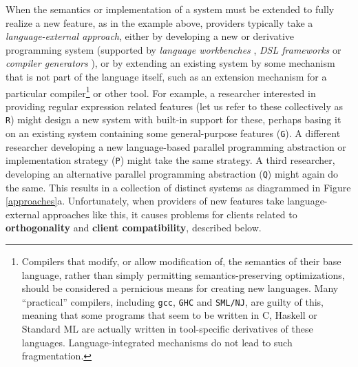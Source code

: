When the semantics or implementation of a system must be extended to fully realize a new feature, as in the example above, providers typically take a \emph{language-external approach}, either by developing a new or derivative programming system (supported by \emph{language workbenches} \cite{erdweg2013state},  \emph{DSL frameworks} \cite{fowler2010domain} or \emph{compiler generators} \cite{abc}), or by extending an existing system by some mechanism that is not part of the language itself, such as an extension mechanism for a {particular} compiler\footnote{Compilers that modify, or allow modification of, the semantics of their base language, rather than simply permitting semantics-preserving optimizations, should be considered a pernicious means for creating new languages. Many ``practical'' compilers, including \texttt{gcc}, \texttt{GHC} and \texttt{SML/NJ}, are guilty of this, meaning that some programs that seem to be written in C, Haskell or Standard ML are actually written in tool-specific derivatives of these languages. Language-integrated mechanisms do not lead to such fragmentation.} or other tool. For example, a researcher interested in providing regular expression related features (let us refer to these collectively as \texttt{R}) might design a new system with built-in support for these, perhaps basing it on an existing system containing some general-purpose features (\texttt{G}). A different researcher developing a new language-based parallel programming abstraction or implementation strategy (\texttt{P}) might  take the same strategy. A third researcher, developing an alternative parallel programming abstraction (\texttt{Q}) might again do the same. This results in a collection of distinct systems as diagrammed in Figure \ref{approaches}a. Unfortunately, when providers of new features take language-external approaches like this, it causes  problems for clients related to \textbf{orthogonality} and \textbf{client compatibility}, described below. %

